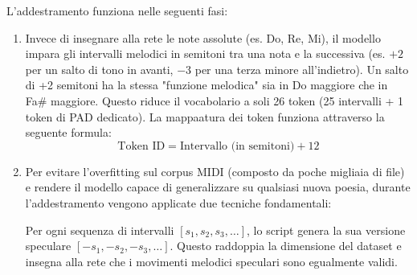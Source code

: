L'addestramento funziona nelle seguenti fasi:
\begin{enumerate}
    \item Invece di insegnare alla rete le note assolute (es. Do, Re, Mi), il modello impara gli intervalli melodici in semitoni tra una nota e la successiva (es. $+2$ per un salto di tono in avanti, $-3$ per una terza minore all'indietro).
    Un salto di +2 semitoni ha la stessa "funzione melodica" sia in Do maggiore che in Fa\# maggiore. Questo riduce il vocabolario a soli 26 token (25 intervalli + 1 token di PAD dedicato).
    La mappaatura dei token funziona attraverso la seguente formula:
    \[
    \text{Token ID} = \text{Intervallo (in semitoni)}+12
    \]
    \item Per evitare l'overfitting sul corpus MIDI (composto da poche migliaia di file) e rendere il modello capace di generalizzare su qualsiasi nuova poesia, durante l'addestramento vengono applicate due tecniche fondamentali:

    Per ogni sequenza di intervalli $[s_1, s_2, s_3, \dots]$, lo script genera la sua versione speculare $[-s_1, -s_2, -s_3, \dots]$. Questo raddoppia la dimensione del dataset e insegna alla rete che i movimenti melodici speculari sono egualmente validi.


\end{enumerate}
